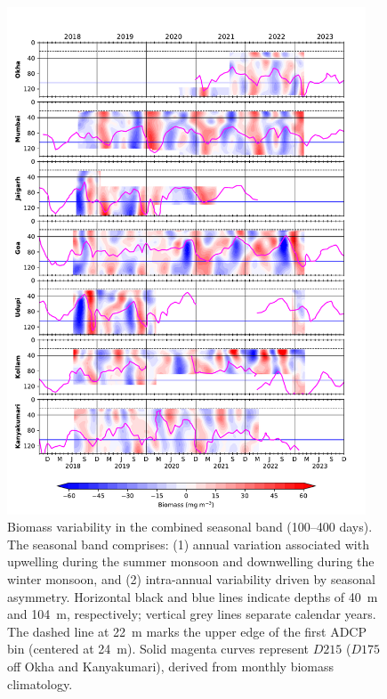\documentclass[authoryear,review,11pt]{elsarticle}
\begin{document}
\begin{figure}[htbp]
	\centering
	\includegraphics[width=0.95\textwidth]{./fig_08_filtered_biomass_seasonal_100_400days.pdf} 
	\captionsetup{justification=justified,font=footnotesize,skip=0.05\baselineskip,width=\textwidth}
	\caption{Biomass variability in the combined seasonal band (100--400 days). The seasonal band comprises: (1) annual variation associated with upwelling during the summer monsoon and downwelling during the winter monsoon, and (2) intra-annual variability driven by seasonal asymmetry. Horizontal black and blue lines indicate depths of 40~m and 104~m, respectively; vertical grey lines separate calendar years. The dashed line at 22~m marks the upper edge of the first ADCP bin (centered at 24~m). Solid magenta curves represent $D215$ ($D175$ off Okha and Kanyakumari), derived from monthly biomass climatology.}
	\label{fig:filtered_biomass_seasonal_100_400days}
\end{figure}
\end{document}
